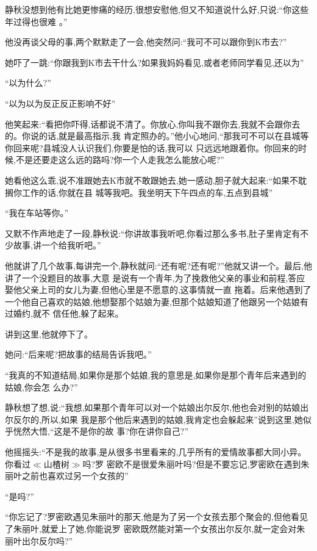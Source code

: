 ﻿\documentclass[12pt]{article}
\begin{document}
静秋没想到他有比她更惨痛的经历,很想安慰他,但又不知道说什么好,只说:``你这些年过得\myrule 也很难
\myrule 。''

他没再谈父母的事,两个默默走了一会,他突然问:``我\myrule 可不可以跟你到K市去?''

她吓了一跳:``你跟我到K市去干什么?如果我妈妈看见,或者老师同学看见,还以为\myrule ''

``以为什么?''

``以为\myrule 以为\myrule 反正\myrule 反正影响不好\myrule ''

他笑起来:``看把你吓得,话都说不清了。你放心,你叫我不跟你去,我就不会跟你去的。你说的话,就是最高指示,我
肯定照办的。''他小心地问,``那我可不可以在县城等你回来呢?县城没人认识我们\myrule ,你要是怕的话,我可以
只远远地跟着你。你回来的时候,不是还要走这么远的路吗?你一个人走\myrule 我怎么能放心呢?''

她看他这么乖,说不准跟她去K市就不敢跟她去,她一感动,胆子就大起来:``如果不耽搁你工作的话,你\myrule 就在县
城等我吧。我坐明天下午四点的车,五点到县城\myrule ''

``我在车站等你。''

又默不作声地走了一段,静秋说:``你讲故事我听吧,你看过那么多书,肚子里肯定有不少故事,讲一个给我听吧。''

他就讲了几个故事,每讲完一个,静秋就问:``还有呢?还有呢?''他就又讲一个。最后,他讲了一个没题目的故事,大意
是说有一个青年,为了挽救他父亲的事业和前程,答应娶他父亲上司的女儿为妻,但他心里是不愿意的,这事情就一直
拖着。后来他遇到了一个他自己喜欢的姑娘,他想娶那个姑娘为妻,但那个姑娘知道了他跟另一个姑娘有过婚约,就不
信任他,躲了起来。

讲到这里,他就停下了。

她问:``后来呢?把故事的结局告诉我吧。''

``我真的不知道结局\myrule ,如果你是\myrule 那个姑娘,我的意思是,如果你是那个青年后来遇到的姑娘,你会怎
么办?''

静秋想了想,说:``我想,如果那个青年可以对一个姑娘出尔反尔,他也会对别的姑娘出尔反尔的,所以\myrule ,如果
我是那个他后来遇到的姑娘,我\myrule 肯定也会躲起来\myrule ''说到这里,她似乎恍然大悟,``这是不是你的故
事?你在讲你自己?''

他摇摇头:``不是我的故事,是从很多书里看来的,几乎所有的爱情故事都大同小异。你看过$\ll$山楂树$\gg$吗?罗
密欧不是很爱朱丽叶吗?但是不要忘记,罗密欧在遇到朱丽叶之前也喜欢过另一个女孩的\myrule ''

``是吗?''

``你忘记了?罗密欧遇见朱丽叶的那天,他是为了另一个女孩去那个聚会的,但他看见了朱丽叶,就爱上了她,你能说罗
密欧既然能对第一个女孩出尔反尔,就一定会对朱丽叶出尔反尔吗?''
\end{document}
